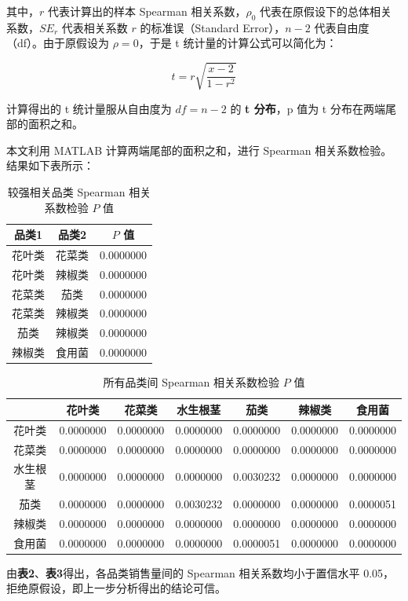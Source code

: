 \documentclass{article}
\begin{document}
	其中，\(r\) 代表计算出的样本 Spearman 相关系数，\(\rho_0\) 代表在原假设下的总体相关系数，\(SE_r\) 代表相关系数 \(r\) 的标准误（Standard Error），\(n-2\) 代表自由度（df）。由于原假设为 \(\rho = 0\)，于是 t 统计量的计算公式可以简化为：
	
	\begin{equation}
		t = r \sqrt{\frac{x-2}{1-r^2}}
		\label{eq:t_test_simplified}
	\end{equation}
	
	计算得出的 t 统计量服从自由度为 \(\textit{df} = n - 2\) 的 \textbf{t 分布}，p 值为 t 分布在两端尾部的面积之和。
	
	本文利用 MATLAB 计算两端尾部的面积之和，进行 Spearman 相关系数检验。结果如下表所示：
	
	\begin{table}[htbp]
		\centering
		\caption{较强相关品类 Spearman 相关系数检验 \(P\) 值}
		\label{tab:spearman_p_strong}
		\renewcommand{\arraystretch}{1.5}
		\renewcommand{\heavyrulewidth}{1.2pt}
		\begin{tabular}{ccc}
			\toprule
			品类1 & 品类2 & \(P\) 值 \\
			\midrule
			花叶类 & 花菜类 & 0.0000000 \\
			花叶类 & 辣椒类 & 0.0000000 \\
			花菜类 & 茄类 & 0.0000000 \\
			花菜类 & 辣椒类 & 0.0000000 \\
			茄类 & 辣椒类 & 0.0000000 \\
			辣椒类 & 食用菌 & 0.0000000 \\
			\bottomrule
		\end{tabular}
		\renewcommand{\heavyrulewidth}{0.8pt}
	\end{table}
	
	\begin{table}[htbp]
		\centering
		\caption{所有品类间 Spearman 相关系数检验 \(P\) 值}
		\label{tab:spearman_p_all}
		\renewcommand{\arraystretch}{1.5}
		\renewcommand{\heavyrulewidth}{1.2pt}
		\begin{tabular}{ccccccc}
			\toprule
			& 花叶类 & 花菜类 & 水生根茎 & 茄类 & 辣椒类 & 食用菌 \\
			\midrule
			花叶类 & 0.0000000 & 0.0000000 & 0.0000000 & 0.0000000 & 0.0000000 & 0.0000000 \\
			花菜类 & 0.0000000 & 0.0000000 & 0.0000000 & 0.0000000 & 0.0000000 & 0.0000000 \\
			水生根茎 & 0.0000000 & 0.0000000 & 0.0000000 & 0.0030232 & 0.0000000 & 0.0000000 \\
			茄类 & 0.0000000 & 0.0000000 & 0.0030232 & 0.0000000 & 0.0000000 & 0.0000051 \\
			辣椒类 & 0.0000000 & 0.0000000 & 0.0000000 & 0.0000000 & 0.0000000 & 0.0000000 \\
			食用菌 & 0.0000000 & 0.0000000 & 0.0000000 & 0.0000051 & 0.0000000 & 0.0000000 \\
			\bottomrule
		\end{tabular}
		\renewcommand{\heavyrulewidth}{0.8pt}
	\end{table}
	
	由\textbf{表2}、\textbf{表3}得出，各品类销售量间的 Spearman 相关系数均小于置信水平 0.05，拒绝原假设，即上一步分析得出的结论可信。
	
	
\end{document}
